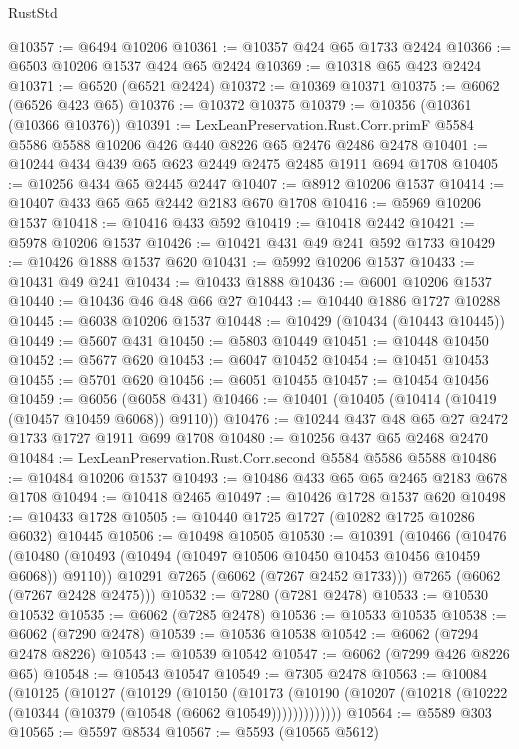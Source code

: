 \begin{lexlean}{RustStd}
\begin{coremodule}
@10357 := @6494 @10206
@10361 := @10357 @424 @65 @1733 @2424
@10366 := @6503 @10206 @1537 @424 @65 @2424
@10369 := @10318 @65 @423 @2424
@10371 := @6520 (@6521 @2424)
@10372 := @10369 @10371
@10375 := @6062 (@6526 @423 @65)
@10376 := @10372 @10375
@10379 := @10356 (@10361 (@10366 @10376))
@10391 := LexLeanPreservation.Rust.Corr.primF
    @5584
    @5586
    @5588
    @10206
    @426
    @440
    @8226
    @65
    @2476
    @2486
    @2478
@10401 := @10244 @434 @439 @65 @623 @2449 @2475 @2485 @1911 @694 @1708
@10405 := @10256 @434 @65 @2445 @2447
@10407 := @8912 @10206 @1537
@10414 := @10407 @433 @65 @65 @2442 @2183 @670 @1708
@10416 := @5969 @10206 @1537
@10418 := @10416 @433 @592
@10419 := @10418 @2442
@10421 := @5978 @10206 @1537
@10426 := @10421 @431 @49 @241 @592 @1733
@10429 := @10426 @1888 @1537 @620
@10431 := @5992 @10206 @1537
@10433 := @10431 @49 @241
@10434 := @10433 @1888
@10436 := @6001 @10206 @1537
@10440 := @10436 @46 @48 @66 @27
@10443 := @10440 @1886 @1727 @10288
@10445 := @6038 @10206 @1537
@10448 := @10429 (@10434 (@10443 @10445))
@10449 := @5607 @431
@10450 := @5803 @10449
@10451 := @10448 @10450
@10452 := @5677 @620
@10453 := @6047 @10452
@10454 := @10451 @10453
@10455 := @5701 @620
@10456 := @6051 @10455
@10457 := @10454 @10456
@10459 := @6056 (@6058 @431)
@10466 := @10401 (@10405 (@10414 (@10419 (@10457 @10459 @6068)) @9110))
@10476 := @10244 @437 @48 @65 @27 @2472 @1733 @1727 @1911 @699 @1708
@10480 := @10256 @437 @65 @2468 @2470
@10484 := LexLeanPreservation.Rust.Corr.second @5584 @5586 @5588
@10486 := @10484 @10206 @1537
@10493 := @10486 @433 @65 @65 @2465 @2183 @678 @1708
@10494 := @10418 @2465
@10497 := @10426 @1728 @1537 @620
@10498 := @10433 @1728
@10505 := @10440 @1725 @1727 (@10282 @1725 @10286 @6032) @10445
@10506 := @10498 @10505
@10530 := @10391
    (@10466
      (@10476
        (@10480 (@10493 (@10494 (@10497 @10506 @10450 @10453 @10456 @10459 @6068)) @9110))
        @10291
        @7265
        (@6062 (@7267 @2452 @1733)))
      @7265
      (@6062 (@7267 @2428 @2475)))
@10532 := @7280 (@7281 @2478)
@10533 := @10530 @10532
@10535 := @6062 (@7285 @2478)
@10536 := @10533 @10535
@10538 := @6062 (@7290 @2478)
@10539 := @10536 @10538
@10542 := @6062 (@7294 @2478 @8226)
@10543 := @10539 @10542
@10547 := @6062 (@7299 @426 @8226 @65)
@10548 := @10543 @10547
@10549 := @7305 @2478
@10563 := @10084
    (@10125
      (@10127
        (@10129
          (@10150
            (@10173
              (@10190 (@10207 (@10218 (@10222 (@10344 (@10379 (@10548 (@6062 @10549)))))))))))))
@10564 := @5589 @303
@10565 := @5597 @8534
@10567 := @5593 (@10565 @5612)

\end{coremodule}
\end{lexlean}
